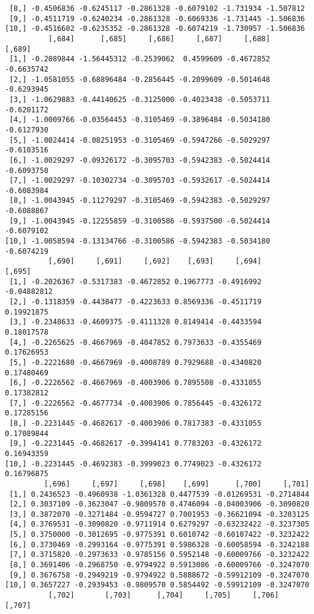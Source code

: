 \documentclass[
  letterpaper,
  DIV=11,
  numbers=noendperiod]{scrreprt}
\begin{document}
\begin{verbatim}
 [8,] -0.4506836 -0.6245117 -0.2861328 -0.6079102 -1.731934 -1.507812
 [9,] -0.4511719 -0.6240234 -0.2861328 -0.6069336 -1.731445 -1.506836
[10,] -0.4516602 -0.6235352 -0.2861328 -0.6074219 -1.730957 -1.506836
          [,684]      [,685]     [,686]     [,687]     [,688]     [,689]
 [1,] -0.2089844 -1.56445312 -0.2539062  0.4599609 -0.4672852 -0.6635742
 [2,] -1.0581055 -0.68896484 -0.2856445 -0.2099609 -0.5014648 -0.6293945
 [3,] -1.0629883 -0.44140625 -0.3125000 -0.4023438 -0.5053711 -0.6201172
 [4,] -1.0009766 -0.03564453 -0.3105469 -0.3896484 -0.5034180 -0.6127930
 [5,] -1.0024414 -0.08251953 -0.3105469 -0.5947266 -0.5029297 -0.6103516
 [6,] -1.0029297 -0.09326172 -0.3095703 -0.5942383 -0.5024414 -0.6093750
 [7,] -1.0029297 -0.10302734 -0.3095703 -0.5932617 -0.5024414 -0.6083984
 [8,] -1.0043945 -0.11279297 -0.3105469 -0.5942383 -0.5029297 -0.6088867
 [9,] -1.0043945 -0.12255859 -0.3100586 -0.5937500 -0.5024414 -0.6079102
[10,] -1.0058594 -0.13134766 -0.3100586 -0.5942383 -0.5034180 -0.6074219
          [,690]     [,691]     [,692]    [,693]     [,694]      [,695]
 [1,] -0.2026367 -0.5317383 -0.4672852 0.1967773 -0.4916992 -0.04882812
 [2,] -0.1318359 -0.4438477 -0.4223633 0.8569336 -0.4511719  0.19921875
 [3,] -0.2348633 -0.4609375 -0.4111328 0.8149414 -0.4433594  0.18017578
 [4,] -0.2265625 -0.4667969 -0.4047852 0.7973633 -0.4355469  0.17626953
 [5,] -0.2221680 -0.4667969 -0.4008789 0.7929688 -0.4340820  0.17480469
 [6,] -0.2226562 -0.4667969 -0.4003906 0.7895508 -0.4331055  0.17382812
 [7,] -0.2226562 -0.4677734 -0.4003906 0.7856445 -0.4326172  0.17285156
 [8,] -0.2231445 -0.4682617 -0.4003906 0.7817383 -0.4331055  0.17089844
 [9,] -0.2231445 -0.4682617 -0.3994141 0.7783203 -0.4326172  0.16943359
[10,] -0.2231445 -0.4692383 -0.3999023 0.7749023 -0.4326172  0.16796875
         [,696]     [,697]     [,698]    [,699]      [,700]     [,701]
 [1,] 0.2436523 -0.4960938 -1.0361328 0.4477539 -0.01269531 -0.2714844
 [2,] 0.3037109 -0.3623047 -0.9809570 0.4746094 -0.04003906 -0.3090820
 [3,] 0.3872070 -0.3271484 -0.9594727 0.7001953 -0.36621094 -0.3203125
 [4,] 0.3769531 -0.3090820 -0.9711914 0.6279297 -0.63232422 -0.3237305
 [5,] 0.3750000 -0.3012695 -0.9775391 0.6010742 -0.60107422 -0.3232422
 [6,] 0.3730469 -0.2993164 -0.9775391 0.5986328 -0.60058594 -0.3242188
 [7,] 0.3715820 -0.2973633 -0.9785156 0.5952148 -0.60009766 -0.3232422
 [8,] 0.3691406 -0.2968750 -0.9794922 0.5913086 -0.60009766 -0.3247070
 [9,] 0.3676758 -0.2949219 -0.9794922 0.5888672 -0.59912109 -0.3247070
[10,] 0.3657227 -0.2939453 -0.9809570 0.5854492 -0.59912109 -0.3247070
          [,702]       [,703]      [,704]     [,705]     [,706]     [,707]

\end{verbatim}
\end{document}
